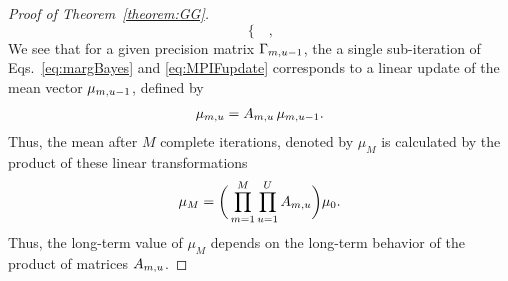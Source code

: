 \begin{proof}[Proof of Theorem~\ref{theorem:GG}]
\begin{equation*}
\begin{cases}
\end{cases},
\end{equation*}
We see that for a given precision matrix $\Gamma_{m, u-1}$, the a single sub-iteration of Eqs.~\ref{eq:margBayes} and \ref{eq:MPIFupdate} corresponds to a linear update of the mean vector $\mu_{m, u-1}$, defined by
\begin{align*}
  \mu_{m, u} = A_{m, u} \, \mu_{m, u-1}.
\end{align*}
Thus, the mean after $M$ complete iterations, denoted by $\mu_{M}$ is calculated by the product of these linear transformations
\begin{align*}
  \mu_M = \bigg(\prod_{m = 1}^M\prod_{u = 1}^U A_{m, u}\bigg)\mu_0. 
\end{align*}
Thus, the long-term value of $\mu_M$ depends on the long-term behavior of the product of matrices $A_{m, u}$. 


\end{proof}
